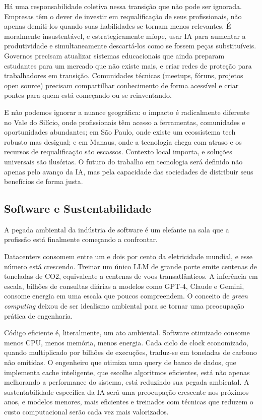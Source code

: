 Há uma responsabilidade coletiva nessa transição que não pode ser
ignorada. Empresas têm o dever de investir em requalificação de seus
profissionais, não apenas demiti-los quando suas habilidades se tornam
menos relevantes. É moralmente insustentável, e estrategicamente
míope, usar IA para aumentar a produtividade e simultaneamente
descartá-los como se fossem peças substituíveis. Governos precisam
atualizar sistemas educacionais que ainda preparam estudantes para um
mercado que não existe mais, e criar redes de proteção para
trabalhadores em transição. Comunidades técnicas (meetups, fóruns,
projetos open source) precisam compartilhar conhecimento de forma
acessível e criar pontes para quem está começando ou se reinventando.

E não podemos ignorar a nuance geográfica: o impacto é radicalmente
diferente no Vale do Silício, onde profissionais têm acesso a
ferramentas, comunidades e oportunidades abundantes; em São Paulo, onde
existe um ecossistema tech robusto mas desigual; e em Manaus, onde a
tecnologia chega com atraso e os recursos de requalificação são
escassos. Contexto local importa, e soluções universais são ilusórias.
O futuro do trabalho em tecnologia será definido não apenas pelo avanço
da IA, mas pela capacidade das sociedades de distribuir seus benefícios
de forma justa.

\subsection{Software e Sustentabilidade}

A pegada ambiental da indústria de software é um elefante na sala que a profissão está finalmente começando a confrontar.

Datacenters consomem entre um e dois por cento da eletricidade mundial, e esse número está crescendo. Treinar um único LLM de grande porte emite centenas de toneladas de CO2, equivalente a centenas de voos transatlânticos. A inferência em escala, bilhões de consultas diárias a modelos como GPT-4, Claude e Gemini, consome energia em uma escala que poucos compreendem. O conceito de \textit{green computing} deixou de ser idealismo ambiental para se tornar uma preocupação prática de engenharia.

Código eficiente é, literalmente, um ato ambiental. Software otimizado consome menos CPU, menos memória, menos energia. Cada ciclo de clock economizado, quando multiplicado por bilhões de execuções, traduz-se em toneladas de carbono não emitidas. O engenheiro que otimiza uma query de banco de dados, que implementa cache inteligente, que escolhe algoritmos eficientes, está não apenas melhorando a performance do sistema, está reduzindo sua pegada ambiental. A sustentabilidade específica da IA será uma preocupação crescente nos próximos anos, e modelos menores, mais eficientes e treinados com técnicas que reduzem o custo computacional serão cada vez mais valorizados.

